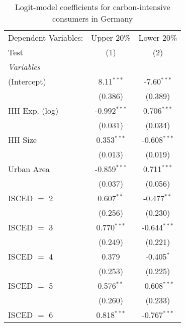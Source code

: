 
\begin{table}[htbp!]
   \centering
   \small
   \begin{adjustbox}{width = 1\textwidth, max height = 0.95\textheight, center}
      \begin{threeparttable}[b]
         \caption{\label{tab:Logit_1_DEU} Logit-model coefficients for carbon-intensive consumers in Germany}
         \begin{tabular}{lcc}
            \tabularnewline \midrule \midrule
            Dependent Variables: & Upper 20\%     & Lower 20\%\\   
            Test                 & (1)            & (2)\\  
            \midrule
            \emph{Variables}\\
            (Intercept)          & 8.11$^{***}$   & -7.60$^{***}$\\   
                                 & (0.386)        & (0.389)\\   
            HH Exp. (log)        & -0.992$^{***}$ & 0.706$^{***}$\\   
                                 & (0.031)        & (0.034)\\   
            HH Size              & 0.353$^{***}$  & -0.608$^{***}$\\   
                                 & (0.013)        & (0.019)\\   
            Urban Area           & -0.859$^{***}$ & 0.711$^{***}$\\   
                                 & (0.037)        & (0.056)\\   
            ISCED $=$ 2          & 0.607$^{**}$   & -0.477$^{**}$\\   
                                 & (0.256)        & (0.230)\\   
            ISCED $=$ 3          & 0.770$^{***}$  & -0.644$^{***}$\\   
                                 & (0.249)        & (0.221)\\   
            ISCED $=$ 4          & 0.379          & -0.405$^{*}$\\   
                                 & (0.253)        & (0.225)\\   
            ISCED $=$ 5          & 0.576$^{**}$   & -0.608$^{***}$\\   
                                 & (0.260)        & (0.233)\\   
            ISCED $=$ 6          & 0.818$^{***}$  & -0.767$^{***}$\\   

\end{tabular}
\end{threeparttable}
\end{adjustbox}
\end{table}
